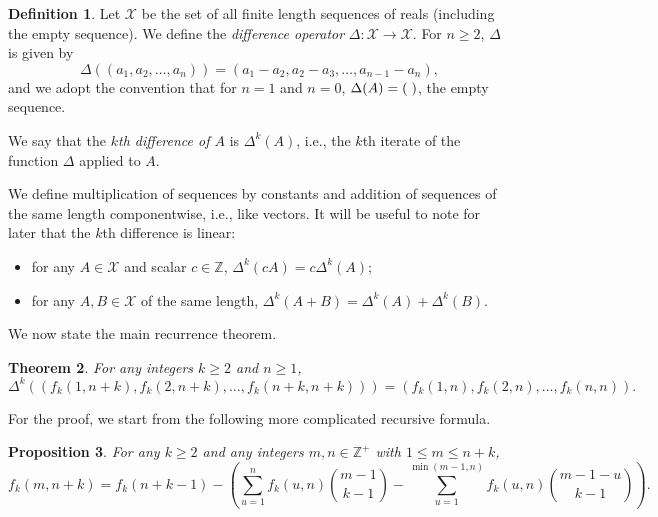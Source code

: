\documentclass{amsart}
\newtheorem{theorem}{Theorem}[section]
\newtheorem{proposition}[theorem]{Proposition}
\theoremstyle{definition}
\newtheorem{definition}[theorem]{Definition}
\begin{document}
\begin{definition}
Let $\mathcal{X}$ be the set of all finite length sequences of reals (including the empty sequence). We define the \emph{difference operator} $\Delta\colon \mathcal{X}\to \mathcal{X}$. For $n\geq 2$, $\Delta$ is given by \[\Delta((a_1,a_2,\ldots, a_n))=(a_1-a_2, a_2-a_3, \ldots, a_{n-1}-a_n),\]
and we adopt the convention that for $n=1$ and $n=0$, $\Delta(A)=(\hspace{1mm})$, the empty sequence.

We say that the \emph{$k$th difference of $A$} is $\Delta^k(A)$, i.e., the $k$th iterate of the function $\Delta$ applied to $A$.
\end{definition}

We define multiplication of sequences by constants and addition of sequences of the same length componentwise, i.e., like vectors. It will be useful to note for later that the $k$th difference is linear:
\begin{itemize}
    \item for any $A\in \mathcal{X}$ and scalar $c\in \mathbb{Z}$, $\Delta^k(cA)=c\Delta^k(A)$;
    \item for any $A,B\in \mathcal{X}$ of the same length, $\Delta^k(A+B)=\Delta^k(A)+\Delta^k(B)$.
\end{itemize}


We now state the main recurrence theorem.
\begin{theorem}\label{thm:mainrec}
For any integers $k\geq 2$ and $n\geq 1$,
\[\Delta^k\left(\left(f_k(1,n+k),f_k(2,n+k),\ldots, f_k(n+k,n+k)\right)\right)=\left(f_k(1,n),f_k(2,n),\ldots,f_k(n,n)\right).\]
\end{theorem}

For the proof, we start from the following more complicated recursive formula.
\begin{proposition}\label{prop:sum}
For any $k\geq 2$ and any integers $m,n\in \mathbb{Z}^+$ with $1\leq m\leq n+k$,
\[f_k(m,n+k)=f_k(n+k-1)-\left(\sum_{u=1}^{n}f_k(u,n)\binom{m-1}{k-1}-\sum_{u=1}^{\min(m-1,n)}f_k(u,n)\binom{m-1-u}{k-1}\right).\]
\end{proposition}
\end{document}
